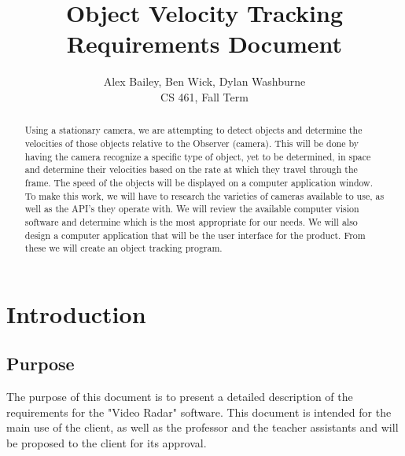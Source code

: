 \documentclass[letterpaper,10pt,onecolumn,draftclsnofoot]{IEEEtran}
\title{Object Velocity Tracking Requirements Document}
\author{Alex Bailey, Ben Wick, Dylan Washburne\\CS 461, Fall Term}
\begin{document}
\begin{titlepage}

\maketitle

\begin{abstract}
Using a stationary camera, we are attempting to detect objects and determine the velocities of those objects relative to the Observer (camera).
This will be done by having the camera recognize a specific type of object, yet to be determined, in space and determine their velocities based on the rate at which they travel through the frame.
The speed of the objects will be displayed on a computer application window.
To make this work, we will have to research the varieties of cameras available to use, as well as the API’s they operate with.
We will review the available computer vision software and determine which is the most appropriate for our needs.
We will also design a computer application that will be the user interface for the product.
From these we will create an object tracking program.

 
\end{abstract}

\end{titlepage}


\section{Introduction}
\subsection{Purpose}
The purpose of this document is to present a detailed description of the requirements for the "Video Radar" software.
This document is intended for the main use of the client, as well as the professor and the teacher assistants and will be proposed to the client for its approval.
\end{document}
